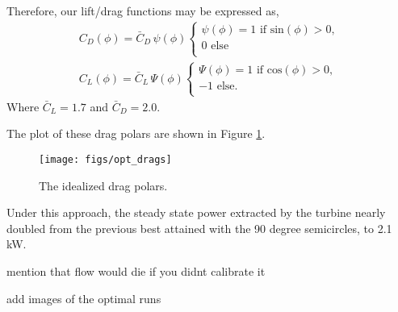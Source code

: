 Therefore, our lift/drag functions may be expressed as,
\begin{align*} 
 C_D(\phi) = \bar C_D \, \psi(\phi) 
  \begin{cases}
   \psi(\phi) = 1 \text{ if sin}(\phi) > 0,   \\
   0 \text{ else} \\
  \end{cases} \\
 C_L(\phi) = \bar C_L \, \Psi(\phi) 
  \begin{cases}
   \Psi(\phi) = 1 \text{ if cos}(\phi) > 0,   \\
   -1 \text{ else}. \\
  \end{cases}
\end{align*}
Where $\bar C_L = 1.7$ and $\bar C_D = 2.0$.

The plot of these drag polars are shown in Figure \ref{drags}. 

\begin{figure}[!htb]
  \begin{center}
    \texttt{[image: figs/opt\_drags]}
    \caption{The idealized drag polars.} 
    \label{drags}
  \end{center}
\end{figure}

Under this approach, the steady state power extracted by the
turbine nearly doubled from the previous best attained with the 90
degree semicircles, to 2.1 kW.

mention that flow would die if you didnt calibrate it

add images of the optimal runs